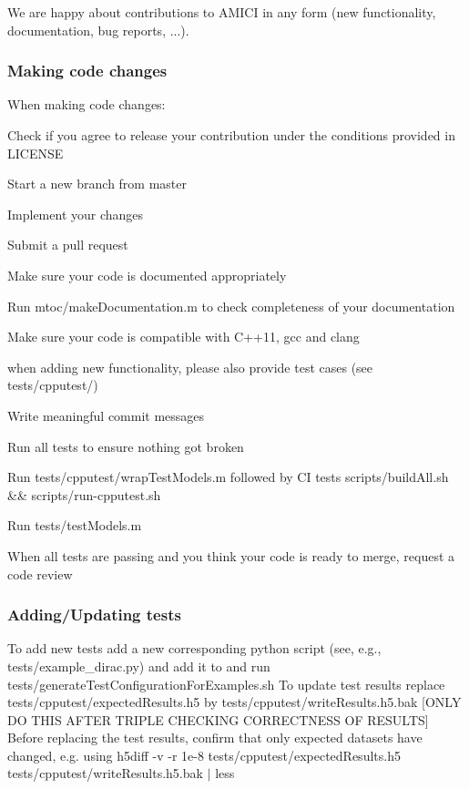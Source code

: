 We are happy about contributions to A\+M\+I\+CI in any form (new functionality, documentation, bug reports, ...).

\subsubsection*{Making code changes}

When making code changes\+:


\begin{DoxyItemize}
\item Check if you agree to release your contribution under the conditions provided in {\ttfamily L\+I\+C\+E\+N\+SE}
\item Start a new branch from {\ttfamily master}
\item Implement your changes
\item Submit a pull request
\item Make sure your code is documented appropriately
\begin{DoxyItemize}
\item Run {\ttfamily mtoc/make\+Documentation.\+m} to check completeness of your documentation
\end{DoxyItemize}
\item Make sure your code is compatible with C++11, {\ttfamily gcc} and {\ttfamily clang}
\item when adding new functionality, please also provide test cases (see {\ttfamily tests/cpputest/})
\item Write meaningful commit messages
\item Run all tests to ensure nothing got broken
\begin{DoxyItemize}
\item Run {\ttfamily tests/cpputest/wrap\+Test\+Models.\+m} followed by CI tests {\ttfamily scripts/build\+All.\+sh \&\& scripts/run-\/cpputest.\+sh}
\item Run {\ttfamily tests/test\+Models.\+m}
\end{DoxyItemize}
\item When all tests are passing and you think your code is ready to merge, request a code review
\end{DoxyItemize}

\subsubsection*{Adding/\+Updating tests}

To add new tests add a new corresponding python script (see, e.\+g., {\ttfamily tests/example\+\_\+dirac.\+py}) and add it to and run {\ttfamily tests/generate\+Test\+Configuration\+For\+Examples.\+sh} To update test results replace {\ttfamily tests/cpputest/expected\+Results.\+h5} by {\ttfamily tests/cpputest/write\+Results.\+h5.\+bak} \mbox{[}O\+N\+LY DO T\+H\+IS A\+F\+T\+ER T\+R\+I\+P\+LE C\+H\+E\+C\+K\+I\+NG C\+O\+R\+R\+E\+C\+T\+N\+E\+SS OF R\+E\+S\+U\+L\+TS\mbox{]} Before replacing the test results, confirm that only expected datasets have changed, e.\+g. using {\ttfamily h5diff -\/v -\/r 1e-\/8 tests/cpputest/expected\+Results.\+h5 tests/cpputest/write\+Results.\+h5.\+bak $\vert$ less} 